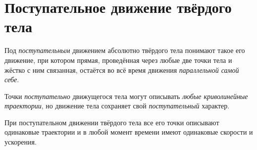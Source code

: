 \section{Поступательное движение твёрдого тела}

Под \textit{поступательным} движением абсолютно твёрдого тела понимают такое его
движение, при котором прямая, проведённая через любые две точки тела и жёстко с
ним связанная, остаётся во всё время движения \textit{параллельной самой себе}.

Точки \textit{поступательно} движущегося тела могут описывать \textit{любые
криволинейные траектории}, но движение тела сохраняет свой
\textit{поступательный} характер.

\begin{theorem}
  При поступательном движении твёрдого тела все его точки описывают одинаковые
  траектории и в любой момент времени имеют одинаковые скорости и ускорения.
\end{theorem}

\begin{figure}[H]
  \centering

  \caption{}
  \label{fig:trajectory_carryover}
\end{figure}

